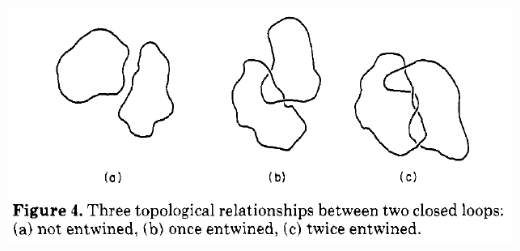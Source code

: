 \documentclass[aspectratio=169,11pt, dvipdfmx]{beamer}
\begin{document}
\begin{frame}
\begin{columns}[totalwidth=1\textwidth]
				\vspace{2mm}
				\includegraphics[width=.85\textwidth]{topological_effect_ring.png}
			\end{columns}
\end{frame}

\setcounter{footnote}{0}
\end{document}

